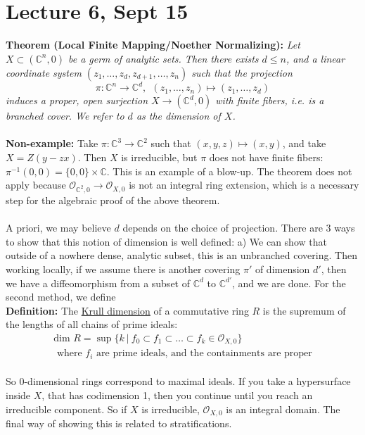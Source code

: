 \documentclass[12pt]{report}
\theoremstyle{definition}
\theoremstyle{remark}
\numberwithin{equation}{section}
\theoremstyle{definition}
\newcommand{\inv}[1]{#1^{-1}}
\newcommand{\bb}[1]{\mathbb{#1}}
\begin{document}
\section*{Lecture 6, Sept 15}
\label{sec:6}
\textbf{Theorem (Local Finite Mapping/Noether Normalizing): }\textit{Let $X \subset (\bb C^n,0)$ be a germ of analytic sets. Then there exists $d \leq n$, and a linear coordinate system $(z_1,\dots,z_d,z_{d+1},\dots,z_n)$ such that the projection}
$$
	\pi: \bb C^n \to \bb C^d,\ \ (z_1, \dots, z_n) \mapsto (z_1,\dots,z_d)
$$
\textit{induces a proper, open surjection $X \to (\bb C^d, 0)$ with finite fibers, i.e. is a branched cover. We refer to $d$ as the dimension of $X$.  }\\\\
\textbf{Non-example: }Take $\pi:\bb C^3 \to \bb C^2$ such that $(x,y,z) \mapsto (x,y)$, and take $X = Z(y-zx)$. Then $X$ is irreducible, but $\pi$ does not have finite fibers: $\inv\pi(0,0) = \{0,0\} \times \bb C$. This is an example of a blow-up. The theorem does not apply because $\mathcal{O}_{\bb C^2,0} \to \mathcal{O}_{X,0}$ is not an integral ring extension, which is a necessary step for the algebraic proof of the above theorem. \\\\
A priori, we may believe $d$ depends on the choice of projection. There are 3 ways to show that this notion of dimension is well defined: a) We can show that outside of a nowhere dense, analytic subset, this is an unbranched covering. Then working locally, if we assume there is another covering $\pi'$ of dimension $d'$, then we have a diffeomorphism from a subset of $\bb C^d$ to $\bb C^{d'}$, and we are done. For the second method, we define\\
\textbf{Definition: }The \underline{Krull dimension} of a commutative ring $R$ is the supremum of the lengths of all chains of prime ideals:\\
\begin{gather*}
	\text{dim }R  = \sup\{k\ |\ f_0 \subset f_1 \subset \dots \subset f_k\in \mathcal{O}_{X,0}\} \\\text{ where } f_i \text{ are prime ideals, and the containments are proper}
\end{gather*}
\\
So 0-dimensional rings correspond to maximal ideals. If you take a hypersurface inside $X$, that has codimension 1, then you continue until you reach an irreducible component. So if $X$ is irreducible, $\mathcal{O}_{X,0}$ is an integral domain. The final way of showing this is related to stratifications.\\
\end{document}
